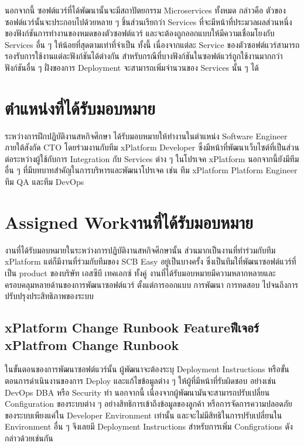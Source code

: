 นอกจากนี้ ซอฟต์แวร์ที่ได้พัฒนานั้นจะมีสถาปัตยกรรม Microservices ทั้งหมด กล่าวคือ ตัวของซอฟต์แวร์นั้นจะประกอบไปด้วยหลาย ๆ ชิ้นส่วนเรียกว่า Services ที่จะมีหน้าที่ประมวลผลส่วนหนึ่งของฟังก์ชันการทำงานของหมดของตัวซอฟต์แวร์ และจะต้องถูกออกแบบให้มีความเชื่อมโยงกับ Services อื่น ๆ ให้น้อยที่สุดตามเท่าที่จำเป็น ทั้งนี้ เนื่องจากแต่ละ Service ของตัวซอฟต์แวร์สามารถรองรับการใช้งานแต่ละฟังก์ชันได้ต่างกัน สำหรับกรณีที่บางฟังก์ชันในซอฟต์แวร์ถูกใช้งานมากกว่าฟังก์ชันอื่น ๆ ฝั่งของการ Deployment จะสามารถเพิ่มจำนวนของ Services นั้น ๆ ได้

\section{ตำแหน่งที่ได้รับมอบหมาย}
ระหว่างการฝึกปฏิบัติงานสหกิจศึกษา ได้รับมอบหมายให้ทำงานในตำแหน่ง Software Engineer ภายใต้สังกัด CTO โดยร่วมงานกับทีม xPlatform Developer ซึ่งมีหน้าที่พัฒนาเว็บไซต์ที่เป็นส่วนต่อระหว่างผู้ใช้กับการ Integration กับ Services ต่าง ๆ ในโปรเจค xPlatform นอกจากนี้ยังมีทีมอื่น ๆ ที่มีบทบาทสำคัญในการบริหารและพัฒนาโปรเจค เช่น ทีม xPlatform Platform Engineer ทีม QA และทีม DevOps


\section{\ifenglish Assigned Work\else งานที่ได้รับมอบหมาย \fi}
งานที่ได้รับมอบหมายในระหว่างการปฏิบัติงานสหกิจศึกษานั้น ส่วนมากเป็นงานที่ทำร่วมกับทีม xPlatform แต่ก็มีงานที่ร่วมกับทีมของ SCB Easy อยู่เป็นบางครั้ง ซึ่งเป็นทีมใที่พัฒนาซอฟต์แวร์ที่เป็น product ของบริษัท เอสซีบี เทคเอกซ์ ทั้งคู่ งานที่ได้รับมอบหมายมีความหลากหลายและครอบคลุมหลายด้านของการพัฒนาซอฟต์แวร์ ตั้งแต่การออกแบบ การพัฒนา การทดสอบ ไปจนถึงการปรับปรุงประสิทธิภาพของระบบ

\subsection{\ifenglish xPlatform Change Runbook​ Feature\else ฟีเจอร์ xPlatfrom Change Runbook\fi}
ในขั้นตอนของการพัฒนาซอฟต์แวร์นั้น ผู้พัฒนาจะต้องระบุ Deployment Instructions หรือขั้นตอนการดำเนินงานของการ Deploy และแก้ไขข้อมูลต่าง ๆ ให้ผู้ที่มีหน้าที่รับผิดชอบ อย่างเช่น DevOps DBA หรือ Security ทำ นอกจากนี้ เนื่องจากผู้พัฒนามันจะสามารถปรับเปลี่ยน Configuration ของระบบต่าง ๆ อย่างสิทธิการเข้าถึงข้อมูลของลูกค้า หรือการจัดการความปลอดภัยของระบบเพียงแค่ใน Developer Environment เท่านั้น และจะไม่มีสิทธิในการปรับเปลี่ยนใน Environment อื่น ๆ จึงเลยมี Deployment Instructions สำหรับการเพิ่ม Configrations ดังกล่าวด้วยเช่นกัน

